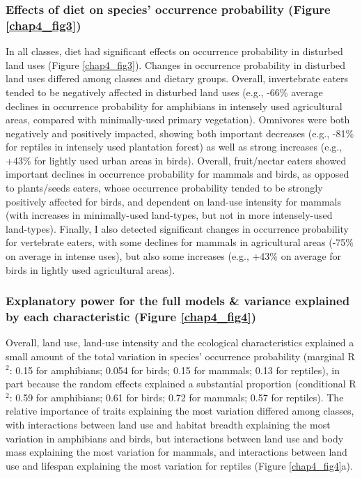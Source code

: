 \subsubsection{Effects of diet on species' occurrence probability (Figure \ref{chap4_fig3})}
In all classes, diet had significant effects on occurrence probability in disturbed land uses (Figure \ref{chap4_fig3}). Changes in occurrence probability in disturbed land uses differed among classes and dietary groups. Overall, invertebrate eaters tended to be negatively affected in disturbed land uses (e.g., -66\% average declines in occurrence probability for amphibians in intensely used agricultural areas, compared with minimally-used primary vegetation). Omnivores were both negatively and positively impacted, showing both important decreases (e.g., -81\% for reptiles in intensely used plantation forest) as well as strong increases (e.g., +43\% for lightly used urban areas in birds). Overall, fruit/nectar eaters showed important declines in occurrence probability for mammals and birds, as opposed to plants/seeds eaters, whose occurrence probability tended to be strongly positively affected for birds, and dependent on land-use intensity for mammals (with increases in minimally-used land-types, but not in more intensely-used land-types). Finally, I also detected significant changes in occurrence probability for vertebrate eaters, with some declines for mammals in agricultural areas (-75\% on average in intense uses), but also some increases (e.g., +43\% on average for birds in lightly used agricultural areas).


\subsubsection{Explanatory power for the full models \& variance explained by each characteristic (Figure \ref{chap4_fig4})}
Overall, land use, land-use intensity and the ecological characteristics explained a small amount of the total variation in species' occurrence probability (marginal R$^2$: 0.15 for amphibians; 0.054 for birds; 0.15 for mammals; 0.13 for reptiles), in part because the random effects explained a substantial proportion (conditional R$^2$: 0.59 for amphibians; 0.61 for birds; 0.72 for mammals; 0.57 for reptiles). The relative importance of traits explaining the most variation differed among classes, with interactions between land use and habitat breadth explaining the most variation in amphibians and birds, but interactions between land use and body mass explaining the most variation for mammals, and interactions between land use and lifespan explaining the most variation for reptiles (Figure \ref{chap4_fig4}a). 

